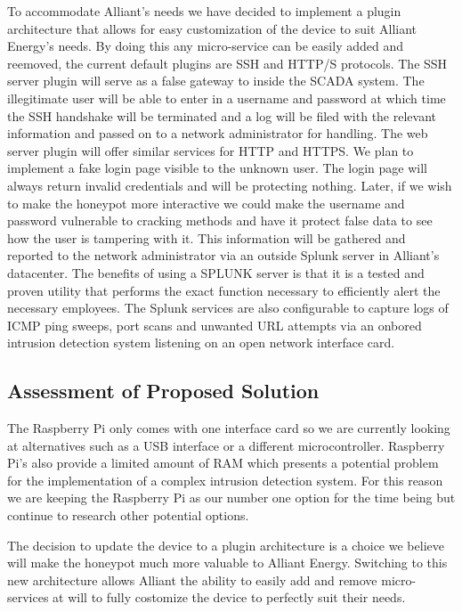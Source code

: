 To accommodate Alliant’s needs we have decided to implement a plugin architecture that allows for easy customization of the device to suit Alliant Energy's needs. By doing this any micro-service can be easily added and reemoved, the current default plugins are SSH and HTTP/S protocols.  The SSH server plugin will serve as a false gateway to inside the SCADA 
system.  The illegitimate user will be able to enter in a username and password at which time the SSH handshake will be terminated
and a log will be filed with the relevant information and passed on to a network administrator for handling.  The web server plugin will
offer similar services for HTTP and HTTPS.  We plan to implement a fake login page visible to the unknown user.  The
login page will always return invalid credentials and will be protecting nothing.  Later, if we wish to make the honeypot more
interactive we could make the username and password vulnerable to cracking methods and have it protect false data to see how the
user is tampering with it.  This information will be gathered and reported to the network administrator via an outside Splunk
server in Alliant’s datacenter.  The benefits of using a SPLUNK server is that it is a tested and proven utility that performs
the exact function necessary to efficiently alert the necessary employees.  The Splunk services are also configurable to capture
logs of ICMP ping sweeps, port scans and unwanted URL attempts via an onbored intrusion detection system listening on an open network interface card.   

\subsection{Assessment of Proposed Solution}

The Raspberry Pi only comes with one interface card so we are currently looking at alternatives such as a USB interface or a different microcontroller.
Raspberry Pi’s also provide a limited amount of RAM which presents a potential problem for the implementation of a complex
intrusion detection system.  For this reason we are keeping the Raspberry Pi as our number one option for the time being but
continue to research other potential options.

The decision to update the device to a plugin architecture is a choice we believe will make the honeypot much more valuable to Alliant Energy.  Switching to this new architecture allows Alliant the ability to easily add and remove micro-services at will to fully costomize the device to perfectly suit their needs.

